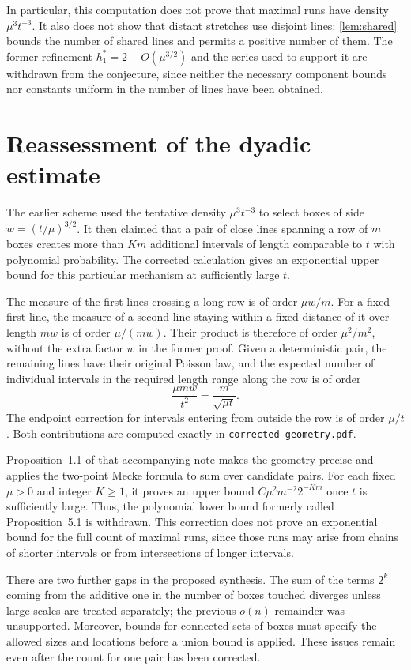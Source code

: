 \documentclass[11pt,letterpaper]{article}
\begin{document}
In particular, this computation does not prove that maximal runs have density $\mu^3t^{-3}$. It also does not show that distant stretches use disjoint lines: \cref{lem:shared} bounds the number of shared lines and permits a positive number of them. The former refinement $h_1^*=2+O(\mu^{3/2})$ and the series used to support it are withdrawn from the conjecture, since neither the necessary component bounds nor constants uniform in the number of lines have been obtained.

\section{Reassessment of the dyadic estimate}
\label{sec:dyadic}

The earlier scheme used the tentative density $\mu^3t^{-3}$ to select boxes of side $w=(t/\mu)^{3/2}$. It then claimed that a pair of close lines spanning a row of $m$ boxes creates more than $Km$ additional intervals of length comparable to $t$ with polynomial probability. The corrected calculation gives an exponential upper bound for this particular mechanism at sufficiently large $t$.

The measure of the first lines crossing a long row is of order $\mu w/m$. For a fixed first line, the measure of a second line staying within a fixed distance of it over length $mw$ is of order $\mu/(mw)$. Their product is therefore of order $\mu^2/m^2$, without the extra factor $w$ in the former proof. Given a deterministic pair, the remaining lines have their original Poisson law, and the expected number of individual intervals in the required length range along the row is of order
\[
 \frac{\mu mw}{t^2}=\frac{m}{\sqrt{\mu t}}.
\]
The endpoint correction for intervals entering from outside the row is of order $\mu/t$. Both contributions are computed exactly in \texttt{corrected-geometry.pdf}.

Proposition~1.1 of that accompanying note makes the geometry precise and applies the two-point Mecke formula to sum over candidate pairs. For each fixed $\mu>0$ and integer $K\ge1$, it proves an upper bound $C\mu^2m^{-2}2^{-Km}$ once $t$ is sufficiently large. Thus, the polynomial lower bound formerly called Proposition~5.1 is withdrawn. This correction does not prove an exponential bound for the full count of maximal runs, since those runs may arise from chains of shorter intervals or from intersections of longer intervals.

There are two further gaps in the proposed synthesis. The sum of the terms $2^k$ coming from the additive one in the number of boxes touched diverges unless large scales are treated separately; the previous $o(n)$ remainder was unsupported. Moreover, bounds for connected sets of boxes must specify the allowed sizes and locations before a union bound is applied. These issues remain even after the count for one pair has been corrected.
\end{document}
